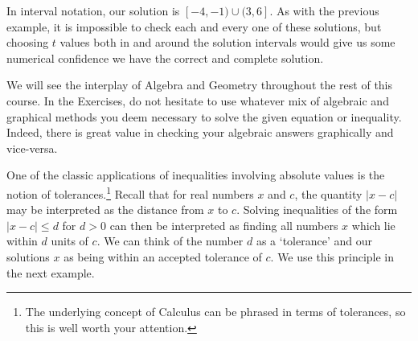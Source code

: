 \documentclass{ximera}
\begin{document}
\begin{example}
\begin{enumerate}
\medskip

In interval notation, our solution is $[-4, -1) \cup (3, 6]$.  As with the previous example, it is impossible to check each and every one of these solutions, but choosing $t$ values both in and around the solution intervals would give us some numerical confidence we have the correct and complete solution.

\end{enumerate}

\end{example}

We will see the interplay of Algebra and Geometry throughout the rest of this course. In the Exercises, do not hesitate to use whatever mix of algebraic and graphical methods you deem necessary to solve the given equation or inequality.  Indeed, there is great value in checking your algebraic answers graphically and vice-versa.

\medskip

One of the classic applications of  inequalities involving absolute values is the notion of tolerances.\footnote{The underlying concept of Calculus can be phrased in terms of tolerances, so this is well worth your attention.} Recall that for real numbers $x$ and $c$, the quantity $|x-c|$ may be interpreted as the distance from $x$ to $c$.  Solving inequalities of the form $|x-c| \leq d$ for $d > 0$ can then be interpreted as finding all numbers $x$ which lie within $d$ units of $c$.  We can think of the number $d$ as a `tolerance' and our solutions $x$ as being within an accepted tolerance of $c$.  We use this principle in the next example.
\end{document}
